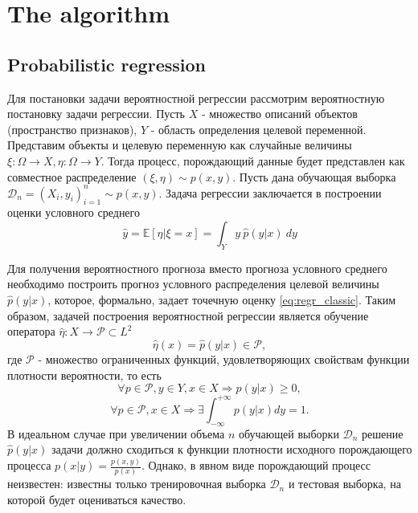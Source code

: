 \documentclass[fleqn,usenatbib]{mnras}
\begin{document}
\section{The algorithm}

\subsection{Probabilistic regression}
Для постановки задачи вероятностной регрессии рассмотрим вероятностную постановку задачи регрессии. Пусть \(X\) - множество описаний объектов (пространство признаков), \(Y\) - область определения целевой переменной. Представим объекты и целевую переменную как случайные величины \(\xi : \Omega \rightarrow X, \eta : \Omega \rightarrow Y \). Тогда процесс, порождающий данные будет представлен как совместное распределение \((\xi, \eta) \sim p(x, y)\). Пусть дана обучающая выборка \(\mathcal{D}_n = (X_i, y_i)_{i=1}^n \sim p(x,y)\). Задача регрессии заключается в построении оценки условного среднего
\begin{equation}\label{eq:regr_classic}
     \hat{y} = \mathbb{E}[\eta | \xi = x] = \int_Y y ~ \hat{p}(y|x) ~ dy
\end{equation}

Для получения вероятностного прогноза вместо прогноза условного среднего необходимо построить прогноз условного распределения целевой величины \(\hat{p}(y|x)\), которое, формально, задает точечную оценку \eqref{eq:regr_classic}. Таким образом, задачей построения вероятностной регрессии является обучение оператора \(\hat{\eta} : X \rightarrow \mathcal{P} \subset L^2\)
\begin{equation}
    \hat{\eta}(x) = \hat{p}(y|x) \in \mathcal{P},
\end{equation}
где \(\mathcal{P}\) - множество ограниченных функций, удовлетворяющих свойствам функции плотности вероятности, то есть
\begin{equation}
    \forall p \in \mathcal{P}, y \in Y, x \in X \Rightarrow p(y|x) \geq 0,
\end{equation}
\begin{equation}
    \forall p \in \mathcal{P}, x \in X \Rightarrow \exists \int_{-\infty}^{+\infty} p(y|x) dy = 1.
\end{equation}
В идеальном случае при увеличении объема \(n\) обучающей выборки \(\mathcal{D}_n\) решение \(\hat{p}(y|x)\) задачи должно сходиться к функции плотности исходного порождающего процесса \(p(x|y) = \frac{p(x,y)}{p(x)}\). Однако, в явном виде порождающий процесс неизвестен: известны только тренировочная выборка \(\mathcal{D}_n\) и тестовая выборка, на которой будет оцениваться качество.
\end{document}
